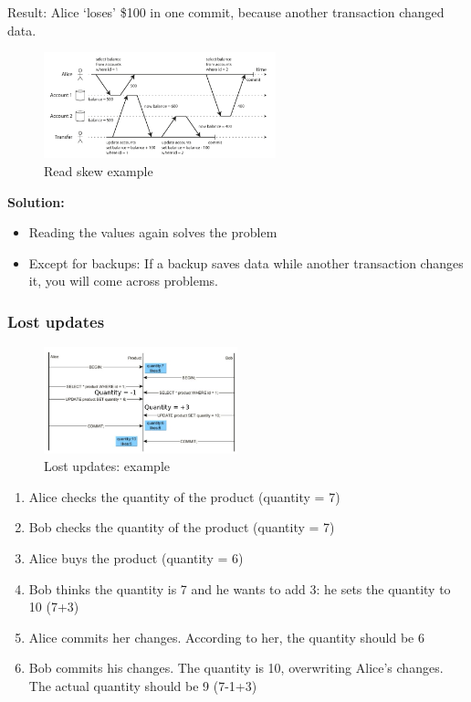 \documentclass{article}
\begin{document}
Result: Alice `loses' \$100 in one commit, because another transaction changed data.

\begin{figure}[H]
    \centering
    \includegraphics[width=0.6\textwidth]{read-skew.png}
    \caption{Read skew example}
\end{figure}

\textbf{Solution:}

\begin{itemize}
    \item Reading the values again solves the problem
    \item Except for backups: If a backup saves data while another transaction changes it, you will come across problems.
\end{itemize}


\subsubsection{Lost updates}

\begin{figure}[H]
    \centering
    \includegraphics[width=0.5\textwidth]{lost-updates-atomic-updates.png}
    \caption{Lost updates: example}
\end{figure}

\begin{enumerate}
    \item Alice checks the quantity of the product (quantity = 7)
    \item Bob checks the quantity of the product (quantity = 7)
    \item Alice buys the product (quantity = 6)
    \item Bob thinks the quantity is 7 and he wants to add 3: he sets the quantity to 10 (7+3)
    \item Alice commits her changes. According to her, the quantity should be 6
    \item Bob commits his changes. The quantity is 10, overwriting Alice's changes. The actual quantity should be 9 (7-1+3)
\end{enumerate}
\end{document}
